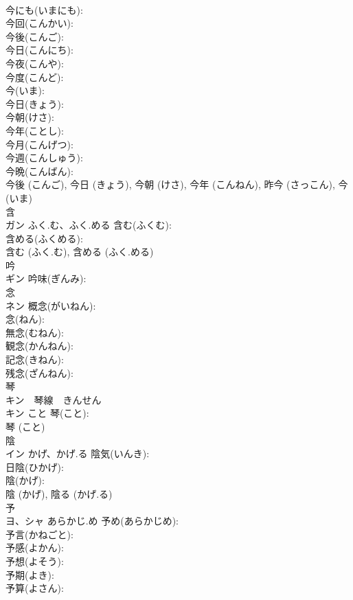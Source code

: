 \documentclass[8pt]{extreport}
\begin{document}
\begin{CJK}{UTF8}{min}
\\	今にも(いまにも): 
\\	今回(こんかい): 
\\	今後(こんご): 
\\	今日(こんにち): 
\\	今夜(こんや): 
\\	今度(こんど): 
\\	今(いま): 
\\	今日(きょう): 
\\	今朝(けさ): 
\\	今年(ことし): 
\\	今月(こんげつ): 
\\	今週(こんしゅう): 
\\	今晩(こんばん): 
\\	今後 (こんご), 今日 (きょう), 今朝 (けさ), 今年 (こんねん), 昨今 (さっこん), 今 (いま)
\\	含			
\\	ガン	ふく.む、ふく.める	含む(ふくむ): 
\\	含める(ふくめる): 
\\	含む (ふく.む), 含める (ふく.める)
\\	吟			
\\	ギン		吟味(ぎんみ): 
\\	念			
\\	ネン		概念(がいねん): 
\\	念(ねん): 
\\	無念(むねん): 
\\	観念(かんねん): 
\\	記念(きねん): 
\\	残念(ざんねん): 
\\	琴			
\\	キン　琴線　きんせん
\\	キン	こと	琴(こと): 
\\	琴 (こと)
\\	陰			
\\	イン	かげ、かげ.る	陰気(いんき): 
\\	日陰(ひかげ): 
\\	陰(かげ): 
\\	陰 (かげ), 陰る (かげ.る)
\\	予			
\\	ヨ、シャ	あらかじ.め	予め(あらかじめ): 
\\	予言(かねごと): 
\\	予感(よかん): 
\\	予想(よそう): 
\\	予期(よき): 
\\	予算(よさん): 

\end{CJK}
\end{document}
